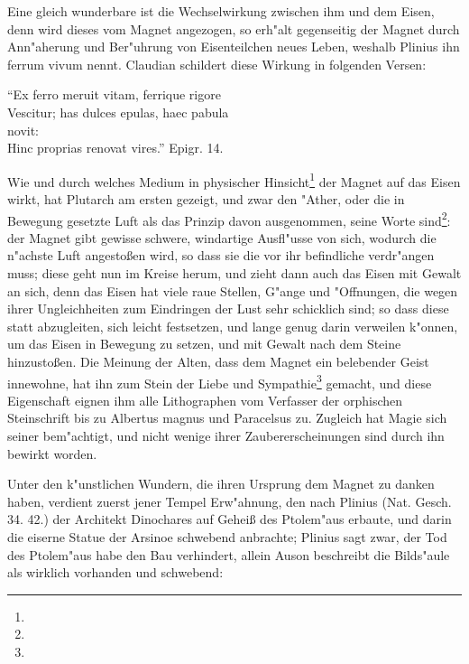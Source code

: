 \documentclass[a4paper, 11pt, oneside, polutonikogreek, german]{article}
\begin{document}
Eine gleich wunderbare ist die Wechselwirkung zwischen ihm und dem Eisen, denn wird dieses vom Magnet angezogen, so erh"alt gegenseitig der Magnet durch Ann"aherung und Ber"uhrung von Eisenteilchen neues Leben, weshalb Plinius ihn ferrum vivum nennt. Claudian schildert diese Wirkung in folgenden Versen:

"`Ex ferro meruit vitam, ferrique rigore\\
\hspace*{0.5cm} Vescitur; has dulces epulas, haec pabula\\
\hspace*{1.5cm} novit:\\
\hspace*{0.5cm} Hinc proprias renovat vires."' Epigr. 14.

Wie und durch welches Medium in physischer Hinsicht\footnote{} der Magnet auf das Eisen wirkt, hat Plutarch am ersten gezeigt, und zwar den "Ather, oder die in Bewegung gesetzte Luft als das Prinzip davon ausgenommen, seine Worte sind\footnote{}: der Magnet gibt gewisse schwere, windartige Ausfl"usse von sich, wodurch die n"achste Luft angestoßen wird, so dass sie die vor ihr befindliche verdr"angen muss; diese geht nun im Kreise herum, und zieht dann auch das Eisen mit Gewalt an sich, denn das Eisen hat viele raue Stellen, G"ange und "Offnungen, die wegen ihrer Ungleichheiten zum Eindringen der Lust sehr schicklich sind; so dass diese statt abzugleiten, sich leicht festsetzen, und lange genug darin verweilen k"onnen, um das Eisen in Bewegung zu setzen, und mit Gewalt nach dem Steine hinzustoßen. Die Meinung der Alten, dass dem Magnet ein belebender Geist innewohne, hat ihn zum Stein der Liebe und Sympathie\footnote{} gemacht, und diese Eigenschaft eignen ihm alle Lithographen vom Verfasser der orphischen Steinschrift bis zu Albertus magnus und Paracelsus zu. Zugleich hat Magie sich seiner bem"achtigt, und nicht wenige ihrer Zaubererscheinungen sind durch ihn bewirkt worden.

Unter den k"unstlichen Wundern, die ihren Ursprung dem Magnet zu danken haben, verdient zuerst jener Tempel Erw"ahnung, den nach Plinius (Nat. Gesch. 34. 42.) der Architekt Dinochares auf Geheiß des Ptolem"aus erbaute, und darin die eiserne Statue der Arsinoe schwebend anbrachte; Plinius sagt zwar, der Tod des Ptolem"aus habe den Bau verhindert, allein Auson beschreibt die Bilds"aule als wirklich vorhanden und schwebend:
\end{document}

